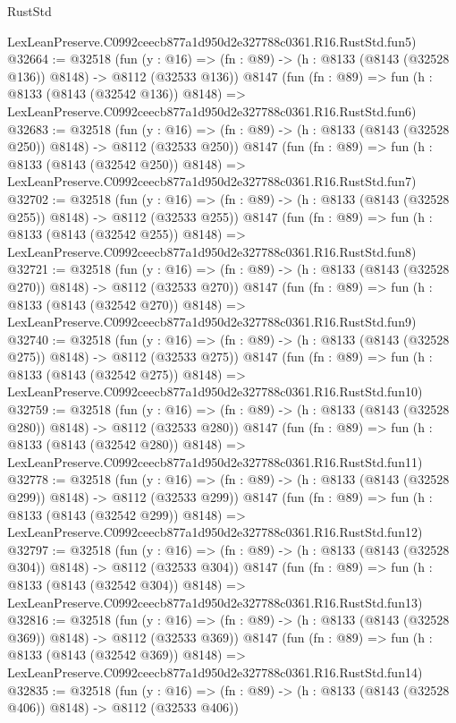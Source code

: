 \begin{lexlean}{RustStd}
\begin{coremodule}
    LexLeanPreserve.C0992ceecb877a1d950d2e327788c0361.R16.RustStd.fun5)
@32664 := @32518
    (fun (y : @16) => (fn : @89) -> (h : @8133 (@8143 (@32528 @136)) @8148) -> @8112 (@32533 @136))
    @8147
    (fun (fn : @89) =>
    fun (h : @8133 (@8143 (@32542 @136)) @8148) =>
    LexLeanPreserve.C0992ceecb877a1d950d2e327788c0361.R16.RustStd.fun6)
@32683 := @32518
    (fun (y : @16) => (fn : @89) -> (h : @8133 (@8143 (@32528 @250)) @8148) -> @8112 (@32533 @250))
    @8147
    (fun (fn : @89) =>
    fun (h : @8133 (@8143 (@32542 @250)) @8148) =>
    LexLeanPreserve.C0992ceecb877a1d950d2e327788c0361.R16.RustStd.fun7)
@32702 := @32518
    (fun (y : @16) => (fn : @89) -> (h : @8133 (@8143 (@32528 @255)) @8148) -> @8112 (@32533 @255))
    @8147
    (fun (fn : @89) =>
    fun (h : @8133 (@8143 (@32542 @255)) @8148) =>
    LexLeanPreserve.C0992ceecb877a1d950d2e327788c0361.R16.RustStd.fun8)
@32721 := @32518
    (fun (y : @16) => (fn : @89) -> (h : @8133 (@8143 (@32528 @270)) @8148) -> @8112 (@32533 @270))
    @8147
    (fun (fn : @89) =>
    fun (h : @8133 (@8143 (@32542 @270)) @8148) =>
    LexLeanPreserve.C0992ceecb877a1d950d2e327788c0361.R16.RustStd.fun9)
@32740 := @32518
    (fun (y : @16) => (fn : @89) -> (h : @8133 (@8143 (@32528 @275)) @8148) -> @8112 (@32533 @275))
    @8147
    (fun (fn : @89) =>
    fun (h : @8133 (@8143 (@32542 @275)) @8148) =>
    LexLeanPreserve.C0992ceecb877a1d950d2e327788c0361.R16.RustStd.fun10)
@32759 := @32518
    (fun (y : @16) => (fn : @89) -> (h : @8133 (@8143 (@32528 @280)) @8148) -> @8112 (@32533 @280))
    @8147
    (fun (fn : @89) =>
    fun (h : @8133 (@8143 (@32542 @280)) @8148) =>
    LexLeanPreserve.C0992ceecb877a1d950d2e327788c0361.R16.RustStd.fun11)
@32778 := @32518
    (fun (y : @16) => (fn : @89) -> (h : @8133 (@8143 (@32528 @299)) @8148) -> @8112 (@32533 @299))
    @8147
    (fun (fn : @89) =>
    fun (h : @8133 (@8143 (@32542 @299)) @8148) =>
    LexLeanPreserve.C0992ceecb877a1d950d2e327788c0361.R16.RustStd.fun12)
@32797 := @32518
    (fun (y : @16) => (fn : @89) -> (h : @8133 (@8143 (@32528 @304)) @8148) -> @8112 (@32533 @304))
    @8147
    (fun (fn : @89) =>
    fun (h : @8133 (@8143 (@32542 @304)) @8148) =>
    LexLeanPreserve.C0992ceecb877a1d950d2e327788c0361.R16.RustStd.fun13)
@32816 := @32518
    (fun (y : @16) => (fn : @89) -> (h : @8133 (@8143 (@32528 @369)) @8148) -> @8112 (@32533 @369))
    @8147
    (fun (fn : @89) =>
    fun (h : @8133 (@8143 (@32542 @369)) @8148) =>
    LexLeanPreserve.C0992ceecb877a1d950d2e327788c0361.R16.RustStd.fun14)
@32835 := @32518
    (fun (y : @16) => (fn : @89) -> (h : @8133 (@8143 (@32528 @406)) @8148) -> @8112 (@32533 @406))

\end{coremodule}
\end{lexlean}
